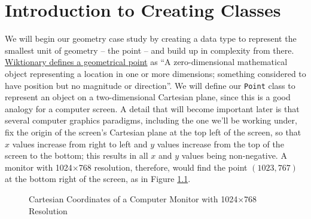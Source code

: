 
\chapter{Introduction to Creating Classes}
\label{chapter:classes}

\minitoc


We will begin our geometry case study by creating a data type to represent the smallest unit of geometry -- the point -- and build up in complexity from there.  \href{https://en.wiktionary.org/wiki/point}{Wiktionary defines a geometrical point} as ``A zero-dimensional mathematical object representing a location in one or more dimensions; something considered to have position but no magnitude or direction''.  We will define our \texttt{Point} class to represent an object on a two-dimensional Cartesian plane, since this is a good analogy for a computer screen.  A detail that will become important later is that several computer graphics paradigms, including the one we'll be working under, fix the origin of the screen's Cartesian plane at the top left of the screen, so that $x$ values increase from right to left and $y$ values increase from the top of the screen to the bottom; this results in all $x$ and $y$ values being non-negative.  A monitor with 1024$\times$768 resolution, therefore, would find the point $(1023,767)$ at the bottom right of the screen, as in Figure \ref{fig:monitor}.

\begin{figure}[ht]
    \color{nccblue}
    \begin{center}
    \end{center}
    \caption{Cartesian Coordinates of a Computer Monitor with 1024$\times$768 Resolution}
    \label{fig:monitor}
\end{figure}

